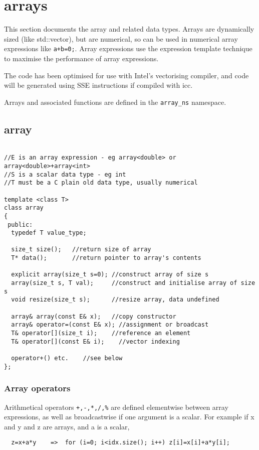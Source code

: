 \section{arrays}

This section documents the array and related data types. Arrays are
dynamically sized (like std::vector), but are numerical, so can be
used in numerical array expressions like \verb"a+b=0;". Array
expressions use the expression template technique\cite{Veldhuizen95}
to maximise the performance of array expressions.

The code has been optimised for use with Intel's vectorising compiler,
and code will be generated using SSE instructions if compiled with icc.

Arrays and associated functions are defined in the
\verb+array_ns+ namespace. 


\subsection{array}\label{array}

\begin{verbatim}

//E is an array expression - eg array<double> or array<double>+array<int>
//S is a scalar data type - eg int
//T must be a C plain old data type, usually numerical

template <class T>
class array
{
 public:
  typedef T value_type;

  size_t size();   //return size of array
  T* data();       //return pointer to array's contents

  explicit array(size_t s=0); //construct array of size s
  array(size_t s, T val);     //construct and initialise array of size s
  void resize(size_t s);      //resize array, data undefined

  array& array(const E& x);   //copy constructor
  array& operator=(const E& x); //assignment or broadcast
  T& operator[](size_t i);    //reference an element
  T& operator[](const E& i);    //vector indexing

  operator+() etc.    //see below
};
\end{verbatim}

\subsubsection{Array operators}

Arithmetical operators \verb"+,-,*,/,%" are defined elementwise
between array expressions, as well as broadcastwise if one argument is
a scalar. For example if x and y and z are arrays, and a is a scalar,
\begin{verbatim}
  z=x+a*y    =>  for (i=0; i<idx.size(); i++) z[i]=x[i]+a*y[i];
\end{verbatim}

